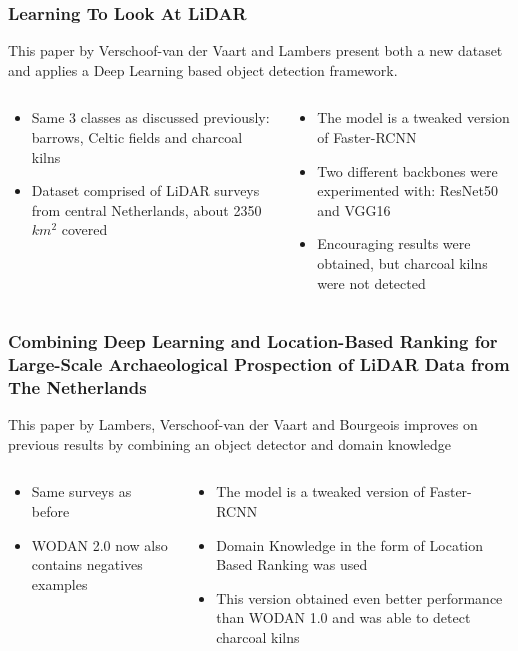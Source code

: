 \documentclass[aspectratio=169]{beamer}
\begin{document}
	\begin{frame}
		\frametitle{Learning To Look At LiDAR}
		This paper by Verschoof-van der Vaart and Lambers\cite{wouter2019} present both a new dataset and applies a Deep Learning based object detection framework.
	\begin{columns}[T] %
		\begin{column}{.48\textwidth}
		\begin{itemize}
			\item Same 3 classes as discussed previously: barrows, Celtic fields and charcoal kilns 
			\item Dataset comprised of LiDAR surveys from central Netherlands, about 2350 $km^2$ covered
		\end{itemize}
		\end{column}
			\hfill
		\begin{column}{.48\textwidth}
		\begin{itemize}
			\item The model is a tweaked version of Faster-RCNN\cite{FasterRCNN} 
			\item Two different backbones were experimented with: ResNet50\cite{resNet} and VGG16\cite{vgg}
			\item Encouraging results were obtained, but charcoal kilns were not detected
		\end{itemize}
		\end{column}
	\end{columns}

	\end{frame}

	\begin{frame}
		\frametitle{Combining Deep Learning and Location-Based Ranking for Large-Scale Archaeological Prospection of LiDAR Data from The Netherlands}
		This paper by  Lambers, Verschoof-van der Vaart and Bourgeois\cite{verschoofAl2020} improves on previous results by combining an object detector and domain knowledge 
	\begin{columns}[T] %
		\begin{column}{.48\textwidth}
		\begin{itemize}
			\item Same surveys as before 
			\item WODAN 2.0 now also contains negatives examples 
		\end{itemize}
		\end{column}
			\hfill
		\begin{column}{.48\textwidth}
		\begin{itemize}
			\item The model is a tweaked version of Faster-RCNN\cite{FasterRCNN}
			\item Domain Knowledge in the form of Location Based Ranking was used 
			\item This version obtained even better performance than WODAN 1.0 and was able to detect charcoal kilns  
		\end{itemize}
		\end{column}
	\end{columns}
	\end{frame}
\end{document}
